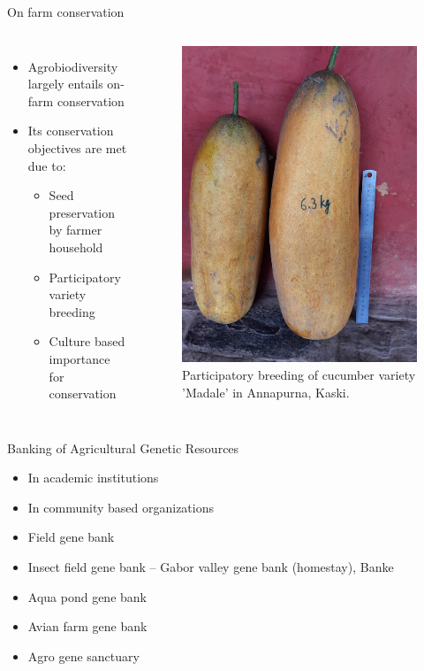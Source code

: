 \documentclass[
  ignorenonframetext,
  aspectratio=169]{beamer}
\providecommand{\tightlist}{%
  \setlength{\itemsep}{0pt}\setlength{\parskip}{0pt}}
\begin{document}
\begin{frame}{On farm conservation}
\protect\hypertarget{on-farm-conservation}{}
\begin{columns}[T,onlytextwidth]
  
  \begin{itemize}
  \footnotesize
  \item Agrobiodiversity largely entails on-farm conservation
  \item Its conservation objectives are met due to:
  \begin{itemize}
    \item Seed preservation by farmer household
    \item Participatory variety breeding
    \item Culture based importance for conservation
  \end{itemize}
  \end{itemize}

  
\begin{figure}
\includegraphics[width=0.55\linewidth]{./../images/madale_kakro} \caption{Participatory breeding of cucumber variety 'Madale' in Annapurna, Kaski.}\label{fig:participatory-breeding}
\end{figure}

\end{columns}
\end{frame}

\begin{frame}{Banking of Agricultural Genetic Resources}
\protect\hypertarget{banking-of-agricultural-genetic-resources}{}
\begin{itemize}
\tightlist
\item
  In academic institutions
\item
  In community based organizations
\item
  Field gene bank
\item
  Insect field gene bank -- Gabor valley gene bank (homestay), Banke
\item
  Aqua pond gene bank
\item
  Avian farm gene bank
\item
  Agro gene sanctuary
\end{itemize}
\end{frame}
\end{document}
